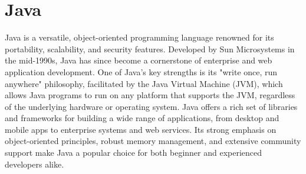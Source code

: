 \chapter{Java}
\thispagestyle{fancy}
\lstset{}\lstset{language=java, style=javastyle}

Java is a versatile, object-oriented programming language renowned for its portability, scalability, and security features. Developed by Sun Microsystems in the mid-1990s, Java has since become a cornerstone of enterprise and web application development. One of Java's key strengths is its "write once, run anywhere" philosophy, facilitated by the Java Virtual Machine (JVM), which allows Java programs to run on any platform that supports the JVM, regardless of the underlying hardware or operating system. Java offers a rich set of libraries and frameworks for building a wide range of applications, from desktop and mobile apps to enterprise systems and web services. Its strong emphasis on object-oriented principles, robust memory management, and extensive community support make Java a popular choice for both beginner and experienced developers alike.